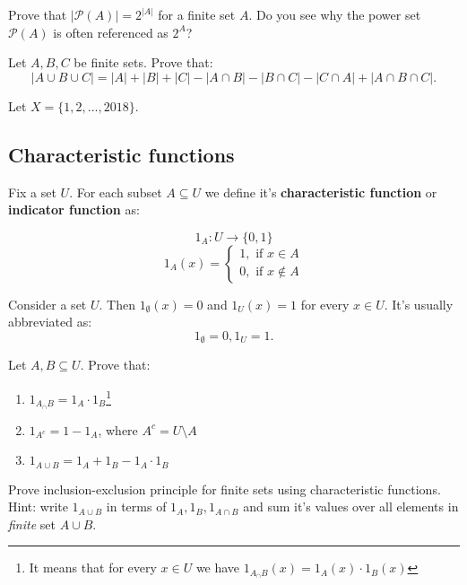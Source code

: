 \begin{exercise}
  Prove that $|\mathcal P(A)|=2^{|A|}$ for a finite set $A$. Do you see why the power set $\mathcal P(A)$ is often referenced as $2^A$?
\end{exercise}

\begin{exercise}
    Let $A,B,C$ be finite sets. Prove that:
		$$|A\cup B\cup C| = |A|+|B|+|C| - |A\cap B| - |B\cap C|-|C\cap A| + |A\cap B\cap C|.$$
\end{exercise}

\begin{exercise}
  Let $X=\{1,2,\dots, 2018\}$.
\end{exercise}

\subsection{Characteristic functions}
\begin{definition}
  Fix a set $U$. For each subset $A\subseteq U$ we define it's \textbf{characteristic function} or \textbf{indicator function} as:

  $$1_A: U\to \{0,1\}$$
  $$1_A(x) = \begin{cases}1, \text{ if } x\in A\\ 0, \text{ if } x\notin A\end{cases}$$
\end{definition}

\begin{example}
  Consider a set $U$. Then $1_\emptyset(x)=0$ and $1_U(x)=1$ for every $x\in U$. It's usually abbreviated as:
  $$1_\emptyset=0, 1_U=1.$$
\end{example}

\begin{exercise}
  Let $A,B\subseteq U$. Prove that:
  \begin{enumerate}
    \item $1_{A_\cap B}=1_A\cdot 1_B$\footnote{It means that for every $x\in U$ we have $1_{A_\cap B}(x)=1_A(x)\cdot 1_B(x)$}
    \item $1_{A^c}=1-1_A$, where $A^c=U\setminus A$
    \item $1_{A\cup B}=1_A+1_B-1_A\cdot 1_B$
  \end{enumerate}
\end{exercise}

\begin{exercise}
  Prove inclusion-exclusion principle for finite sets using characteristic functions. Hint: write $1_{A\cup B}$ in terms of $1_A, 1_B, 1_{A\cap B}$ and sum it's values over
  all elements in \textit{finite} set $A\cup B$.
\end{exercise}


